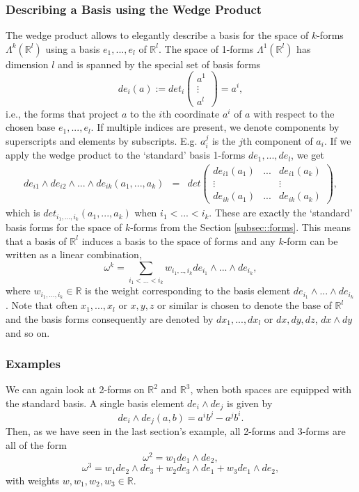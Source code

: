 \subsubsection{Describing a Basis using the Wedge Product}
The wedge product allows to elegantly describe a basis for the space of $k$-forms $\Lambda^k(\mathbb R^l)$ using a basis $e_1,...,e_l$ of $\mathbb R^l$. The space of 1-forms $\Lambda^1(\mathbb R^l)$ has dimension $l$ and is spanned by the special set of basis forms
\[de_i(a) := det_i\begin{pmatrix}
	a^1\\
	\vdots \\
	a^l
\end{pmatrix} = a^i,\]
i.e., the forms that project $a$ to the $i$th coordinate $a^i$ of $a$ with respect to the chosen base $e_1,...,e_l$. If multiple indices are present, we denote components by superscripts and elements by subscripts. E.g. $a_i^j$ is the $j$th component of $a_i$. If we apply the wedge product to the `standard' basis 1-forms $de_1,..., de_l$, we get
\begin{eqnarray*}de_{i1}\wedge de_{i2} \wedge ... \wedge de_{ik}(a_1,...,a_k) &= &det \begin{pmatrix}
de_{i1}(a_1) &  ... & de_{i1}(a_k) \\
\vdots & & \vdots \\
de_{ik}(a_1) &... & de_{ik}(a_k)
\end{pmatrix} ,\end{eqnarray*}
which is $det_{i_1,...,i_k}(a_1,...,a_k)$ when $i_1 <...<i_k$. These are exactly the `standard' basis forms for the space of $k$-forms from the Section \ref{subsec::forms}. This means that a basis of $\mathbb R^l$ induces a basis to the space of forms and any $k$-form can be written as a linear combination,
\[\omega^k = \sum_{i_1<...<i_k} w_{i_1,..,i_k} de_{i_1}\wedge...\wedge de_{i_k}, \]
where $w_{i_1,...,i_k} \in \mathbb R$ is the weight corresponding to the basis element $de_{i_1}\wedge...\wedge de_{i_k}$. Note that often $x_1,...,x_l$ or $x,y,z$ or similar is chosen to denote the base of $\mathbb R^l$ and the basis forms consequently are denoted by $dx_1,..., dx_l$ or $dx,dy,dz$, $dx \wedge dy$ and so on. 

\subsubsection{Examples}
We can again look at 2-forms on $\mathbb R^2$ and $\mathbb R^3$, when both spaces are equipped with the standard basis. A single basis element $de_i\wedge de_j$ is given by
\[de_i\wedge de_j(a,b) = a^ib^j -a^jb^i.\]
Then, as we have seen in the last section's example, all 2-forms and 3-forms are all of the form
\[\omega^2 = w_1de_1\wedge de_2,\]
\[\omega^3 = w_1 de_2 \wedge de_3 + w_2 de_3 \wedge de_1 + w_3 de_1 \wedge de_2,\]
with weights $w,w_1,w_2,w_3 \in \mathbb R$.


